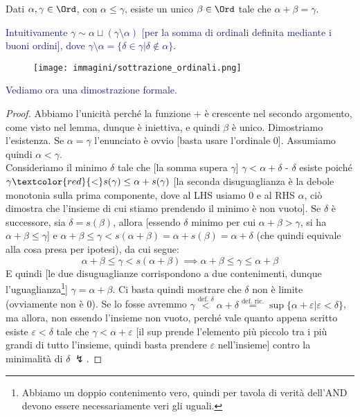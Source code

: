 \documentclass[11pt]{scrartcl}
\begin{document}
\begin{lemma}
	Dati $\alpha, \gamma \in \Ord$, con $\alpha \leq \gamma$, esiste un unico $\beta \in \Ord$ tale che $\alpha + \beta = \gamma$.
\end{lemma}

\textcolor{MidnightBlue}{Intuitivamente $\gamma \sim \alpha \sqcup (\gamma\setminus\alpha)$ [per la somma di ordinali definita mediante i buoni ordini], dove $\gamma\setminus\alpha = \{\delta \in \gamma | \delta \not \in \alpha\}$}.
\begin{figure}[H]
	\centering
	\texttt{[image: immagini/sottrazione\_ordinali.png]}
\end{figure}

\textcolor{MidnightBlue}{Vediamo ora una dimostrazione formale.}

\begin{proof}
	Abbiamo l'unicità perché la funzione $+$ è crescente nel secondo argomento, come visto nel lemma, dunque è iniettiva, e quindi $\beta$ è unico. Dimostriamo l'esistenza. Se $\alpha = \gamma$ l'enunciato è ovvio [basta usare l'ordinale 0]. Assumiamo quindi $\alpha < \gamma$.\\
	Consideriamo il minimo $\delta$ tale che [la somma supera $\gamma$] $\gamma < \alpha + \delta$ - $\delta$ esiste poiché $\gamma \textcolor{red}{<} s(\gamma) \leq \alpha + s(\gamma)$ [la seconda disuguaglianza è la debole monotonia sulla prima componente, dove al LHS usiamo 0 e al RHS $\alpha$, ciò dimostra che l'insieme di cui stiamo prendendo il minimo è non vuoto].
	Se $\delta$ è successore, sia $\delta = s(\beta)$, allora [essendo $\delta$ minimo per cui $\alpha + \beta > \gamma$, si ha $\alpha + \beta \leq \gamma$] e $\alpha + \beta \leq \gamma < s(\alpha + \beta) = \alpha + s(\beta) = \alpha + \delta$ (che quindi equivale alla cosa presa per ipotesi), da cui segue:
	\[ \alpha + \beta \leq \gamma < s(\alpha + \beta) \implies  \alpha + \beta \leq \gamma \leq \alpha + \beta
		\]
	E quindi [le due disuguaglianze corrispondono a due contenimenti, dunque l'uguaglianza\footnote{Abbiamo un doppio contenimento vero, quindi per tavola di verità  dell'AND devono essere necessariamente veri gli uguali.}] $\gamma = \alpha + \beta$.
	Ci basta quindi mostrare che $\delta$ non è limite (ovviamente non è 0). Se lo fosse avremmo $\gamma \overset{\text{def. $\delta$}}{<} \alpha + \delta \overset{\text{def. ric.}}{=} \sup\{\alpha + \varepsilon | \varepsilon < \delta\}$, ma allora, non essendo l'insieme non vuoto, perché vale quanto appena scritto esiste $\varepsilon < \delta$
	tale che $\gamma < \alpha + \varepsilon$ [il sup prende l'elemento più piccolo tra i più grandi di tutto l'insieme, quindi basta prendere $\varepsilon$ nell'insieme] contro la minimalità di $\delta \;\lightning$.
\end{proof}
\end{document}
